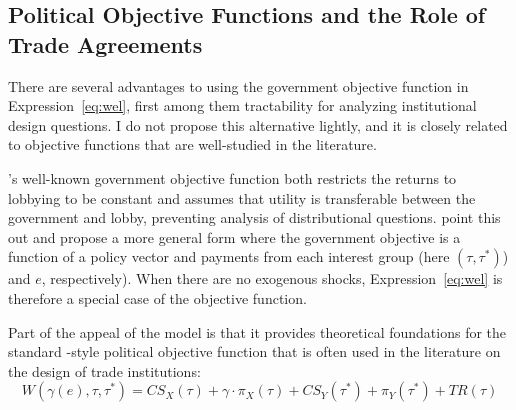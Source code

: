 \documentclass[12pt]{article}
\newtheorem{assumption}{Assumption}
\newcommand{\ve}{\theta}
\newcommand{\ga}{\gamma}
\begin{document}





\subsection{Political Objective Functions and the Role of Trade Agreements}
\label{sec:objfcn}
There are several advantages to using the government objective function in Expression~\ref{eq:wel}, first among them tractability for analyzing institutional design questions. I do not propose this alternative lightly, and it is closely related to objective functions that are well-studied in the literature.

\Textcite{gh94}'s well-known government objective function both restricts the returns to lobbying to be constant and assumes that utility is transferable between the government and lobby, preventing analysis of distributional questions. \Textcite{dgh97} point this out and propose a more general form where the government objective is a function of a policy vector and payments from each interest group (here $\left(\tau,\tau^*\right)$) and $e$, respectively). When there are no exogenous shocks, Expression~\ref{eq:wel} is therefore a special case of the \Textcite{dgh97} objective function.

Part of the appeal of the \Textcite{gh94} model is that it provides theoretical foundations for the standard \Textcite{baldwin}-style political objective function that is often used in the literature on the design of trade institutions:
\begin{equation}
  W(\ga(e),\tau,\tau^*) = \mathit{CS}_X(\tau) + \ga \cdot \pi_X(\tau) + \mathit{CS}_Y(\tau^*) + \pi_Y(\tau^*) + \mathit{TR}(\tau)
  \label{eq:baldwin}
\end{equation}
\end{document}
